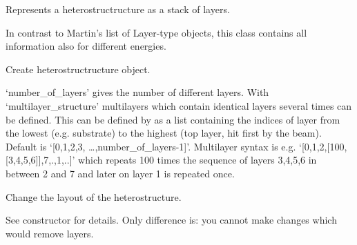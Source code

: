 \documentclass[letterpaper,10pt,english]{sphinxmanual}
\begin{document}
\begin{fulllineitems}
\label{\detokenize{modules-api/samplerepresentation:SampleRepresentation.Heterostructure}}
Represents a heterostructructure as a stack of layers.

In contrast to Martin’s list of Layer-type objects, this class contains all information also for different energies.

\begin{fulllineitems}
\label{\detokenize{modules-api/samplerepresentation:SampleRepresentation.Heterostructure.__init__}}
Create heterostructructure object.

‘number\_of\_layers’ gives the number of different layers.
With ‘multilayer\_structure’ multilayers which contain identical layers several times can be defined.
This can be defined by as a list containing the indices of layer from the lowest (e.g. substrate) to the highest (top layer, hit first by the beam).
Default is ‘{[}0,1,2,3, …,number\_of\_layers-1{]}’. Multilayer syntax is e.g. ‘{[}0,1,2,{[}100,{[}3,4,5,6{]}{]},7,.,1,..{]}’ which repeats 100 times the sequence of
layers 3,4,5,6 in between 2 and 7 and later on layer 1 is repeated once.

\end{fulllineitems}


\begin{fulllineitems}
\label{\detokenize{modules-api/samplerepresentation:SampleRepresentation.Heterostructure.setLayout}}
Change the layout of the heterostructure.

See constructor for details. Only difference is: you cannot make changes which would remove layers.

\end{fulllineitems}



\end{fulllineitems}
\end{document}
